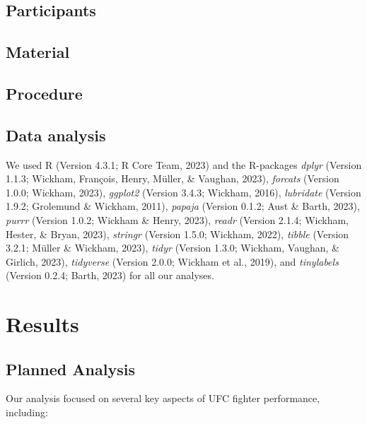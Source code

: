 \documentclass[
  man,floatsintext]{apa6}
\begin{document}
\hypertarget{participants}{%
\subsection{Participants}\label{participants}}

\hypertarget{material}{%
\subsection{Material}\label{material}}

\hypertarget{procedure}{%
\subsection{Procedure}\label{procedure}}

\hypertarget{data-analysis}{%
\subsection{Data analysis}\label{data-analysis}}

We used R (Version 4.3.1; R Core Team, 2023) and the R-packages \emph{dplyr} (Version 1.1.3; Wickham, François, Henry, Müller, \& Vaughan, 2023), \emph{forcats} (Version 1.0.0; Wickham, 2023), \emph{ggplot2} (Version 3.4.3; Wickham, 2016), \emph{lubridate} (Version 1.9.2; Grolemund \& Wickham, 2011), \emph{papaja} (Version 0.1.2; Aust \& Barth, 2023), \emph{purrr} (Version 1.0.2; Wickham \& Henry, 2023), \emph{readr} (Version 2.1.4; Wickham, Hester, \& Bryan, 2023), \emph{stringr} (Version 1.5.0; Wickham, 2022), \emph{tibble} (Version 3.2.1; Müller \& Wickham, 2023), \emph{tidyr} (Version 1.3.0; Wickham, Vaughan, \& Girlich, 2023), \emph{tidyverse} (Version 2.0.0; Wickham et al., 2019), and \emph{tinylabels} (Version 0.2.4; Barth, 2023) for all our analyses.

\hypertarget{results}{%
\section{Results}\label{results}}

\hypertarget{planned-analysis}{%
\subsection{Planned Analysis}\label{planned-analysis}}

Our analysis focused on several key aspects of UFC fighter performance, including:
\end{document}
